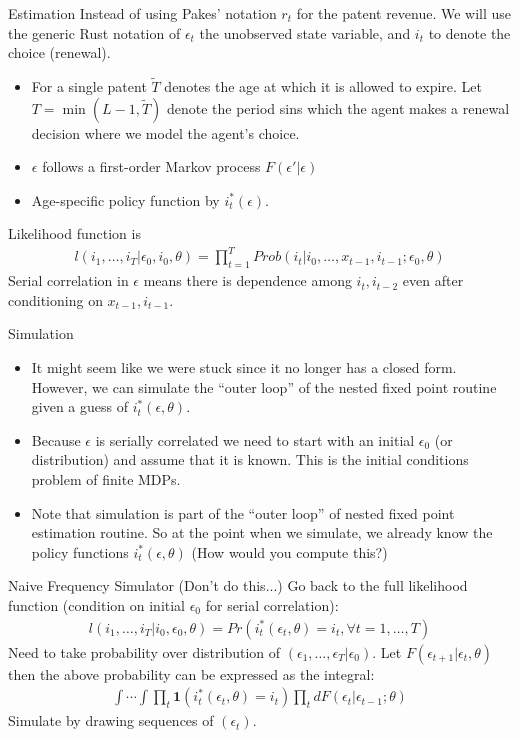 \documentclass[xcolor=pdftex,dvipsnames,table,mathserif,aspectratio=169]{beamer}
\begin{document}
\begin{frame}{Estimation}
Instead of using Pakes' notation $r_t$ for the patent revenue. We will use the generic Rust notation of $\epsilon_t$ the unobserved state variable, and $i_t$ to denote the choice (renewal).
\begin{itemize}
\item For a single patent $\tilde{T}$ denotes the age at which it is allowed to expire. Let $T = \min(L-1,\tilde{T})$ denote the period sins which the agent makes a renewal decision where we model the agent's choice.
\item $\epsilon$ follows a first-order Markov process $F(\epsilon' | \epsilon)$
\item Age-specific policy function by $i^*_t(\epsilon)$.
\end{itemize}
Likelihood function is 
\begin{eqnarray*}
l(i_1,\ldots,i_T | \epsilon_0,i_0,\theta) = \prod_{t=1}^T Prob(i_t | i_0, \ldots,  x_{t-1}, i_{t-1} ; \epsilon_0, \theta)
\end{eqnarray*}
Serial correlation in $\epsilon$ means there is dependence among $i_{t}, i_{t-2}$ even after conditioning on $x_{t-1},i_{t-1}$. 
\end{frame}

\begin{frame}{Simulation}
\begin{itemize}
\item It might seem like we were stuck since it no longer has a closed form.  However, we can simulate the ``outer loop'' of the nested fixed point routine given a guess  of $i^*_t(\epsilon,\theta)$.
\item Because $\epsilon$ is serially correlated we need to start with an initial $\epsilon_0$ (or distribution) and assume that it is known.  This is the \alert{initial conditions problem} of finite MDPs.
\item Note that simulation is part of the ``outer loop'' of nested fixed point estimation routine. So at the point when we simulate, we already know the policy functions $i_t^{*}(\epsilon,\theta)$ (How would you compute this?)
\end{itemize}
\end{frame}

\begin{frame}{Naive Frequency Simulator (Don't do this...)}
Go back to the full likelihood function (condition on initial $\epsilon_0$ for serial correlation):
\begin{eqnarray*}
l(i_1,\ldots,i_T | i_0, \epsilon_0, \theta) = Pr(i_t^{*} (\epsilon_t,\theta) = i_t, \forall t =1,\ldots,T)
\end{eqnarray*}
Need to take probability over distribution of $(\epsilon_1,\ldots,\epsilon_T | \epsilon_0)$.  Let $F(\epsilon_{t+1} | \epsilon_t,\theta)$ then the above probability can be expressed as the integral:
\begin{eqnarray*}
\int \cdots \int \prod_t \mathbf{1}(i_t^{*}(\epsilon_t,\theta) = i_t) \prod_t d F(\epsilon_t | \epsilon_{t-1}; \theta)
\end{eqnarray*}
Simulate by drawing sequences of $(\epsilon_t)$.
\end{frame}
\end{document}

